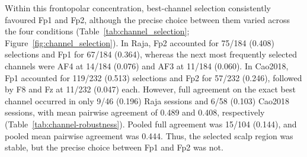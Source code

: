 Within this frontopolar concentration, best-channel selection consistently favoured Fp1 and Fp2, although the precise choice between them varied across the four conditions (Table~\ref{tab:channel_selection}; Figure~\ref{fig:channel_selection}). In Raja, Fp2 accounted for 75/184 (0.408) selections and Fp1 for 67/184 (0.364), whereas the next most frequently selected channels were AF4 at 14/184 (0.076) and AF3 at 11/184 (0.060). In Cao2018, Fp1 accounted for 119/232 (0.513) selections and Fp2 for 57/232 (0.246), followed by F8 and Fz at 11/232 (0.047) each. However, full agreement on the exact best channel occurred in only 9/46 (0.196) Raja sessions and 6/58 (0.103) Cao2018 sessions, with mean pairwise agreement of 0.489 and 0.408, respectively (Table~\ref{tab:channel-robustness}). Pooled full agreement was 15/104 (0.144), and pooled mean pairwise agreement was 0.444. Thus, the selected scalp region was stable, but the precise choice between Fp1 and Fp2 was not.
